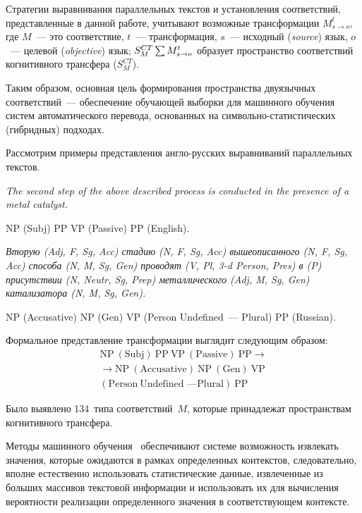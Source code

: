 \begin{multicols}{2}
   Стратегии выравнивания параллельных текстов и установления соответствий,
представленные в данной работе, учитывают возможные трансформации  $M^t_{s\rightarrow o}$,
где $M$~--- это соответствие, $t$~--- трансформация, $s$~--- исходный
(\textit{source}) язык, $o$~--- целевой (\textit{objective}) язык;
$S_M^{CT}\hm\sum M^t_{s\rightarrow o}$ образует пространство соответствий когнитивного
трансфера ($S_M^{CT}$).

   Таким образом, основная цель формирования пространства двуязычных
соответствий~--- обеспечение обучающей выборки для машинного обучения
систем автоматического перевода, основанных на сим\-воль\-но-ста\-ти\-сти\-че\-ских
(гибридных) под\-ходах.

Рассмотрим примеры представления анг\-ло-рус\-ских
выравниваний параллельных текстов.

     \textit{The second step of the above described process is conducted in the
presence of a metal catalyst.}

     NP (Subj) PP VP (Passive) PP (English).

     \textit{Вторую (Adj, F, Sg, Acc) стадию (N, F, Sg, Acc) вышеописанного (N, F,
Sg, Acc) способа (N, M, Sg, Gen) проводят (V, Pl, 3-d Person, Pres) в (P)
присутствии (N, Neutr, Sg, Prep) металлического (Adj, M, Sg, Gen) катализатора
(N, M, Sg, Gen).}

     NP (Accusative) NP (Gen) VP (Person Undefined~--- Plural) PP (Russian).

     Формальное представление трансформации выглядит следующим образом:
     \begin{multline*}
     \mathrm{NP\ (Subj)\ PP\ VP\ (Passive)\ PP}\rightarrow{}\\
{}     \rightarrow\mathrm{NP\ (Accusative)\ NP\ (Gen)\ VP}\\
     (\mathrm{Person\ Undefined}\mbox{~---}
     \mathrm{Plural})\ \mathrm{PP}
     \end{multline*}

     Было выявлено 134~типа соответствий~$M$, которые принадлежат
пространствам когнитивного трансфера.

   Методы машинного обучения~\cite{23-koz, 22-koz} обеспечивают системе
возможность извлекать значения, которые ожидаются в рамках определенных
контекстов, следовательно, вполне естественно использовать статистические
данные, извлеченные из больших массивов текстовой информации и использовать
их для вычисления вероятности реализации определенного значения в
соответствующем контексте.


\end{multicols}
